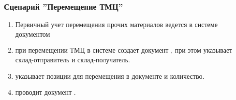 \subsubsection{Сценарий ''Перемещение ТМЦ''}
\label{bp:storage_61}

\begin{enumerate}
\item  	Первичный учет перемещения прочих материалов ведется в системе \erp документом 
\item	\kladovshik при перемещении ТМЦ  в системе \erp создает документ , при этом указывает склад-отправитель и склад-получатель.
\item 	\kladovshik указывает позиции  для перемещения в документе  и количество.
\item 	\kladovshik проводит документ  .
\end{enumerate}





